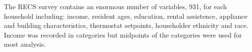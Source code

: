 \documentclass{article}
\begin{document}
The RECS survey contains an enormous number of variables, 931, for each household including: income, resident ages, education, rental assistence, appliance and building characteristics, thermostat setpoints, householder ethnicity and race.  Income was recorded in categories but midpoints of the categories were used for most analysis. 
% 
% 



  
\end{document}
